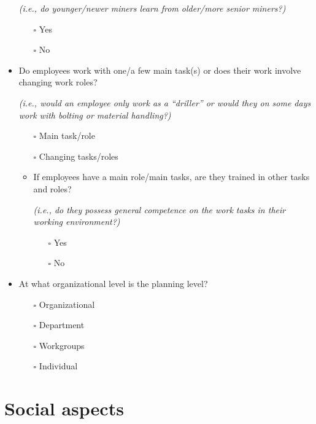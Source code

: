 \documentclass[
  12pt,
]{scrbook}
\providecommand{\tightlist}{%
  \setlength{\itemsep}{0pt}\setlength{\parskip}{0pt}}
\begin{document}
\begin{itemize}
  \emph{(i.e., do younger/newer miners learn from older/more senior miners?)}

  \begin{itemize}
  \tightlist
  \item[$\square$]
    Yes
  \item[$\square$]
    No
  \end{itemize}
\item
  Do employees work with one/a few main task(s) or does their work involve changing work
  roles?

  \emph{(i.e., would an employee only work as a ``driller'' or would they on some days work with bolting or material handling?)}

  \begin{itemize}
  \item[$\square$]
    Main task/role
  \item[$\square$]
    Changing tasks/roles
  \item
    If employees have a main role/main tasks, are they trained in other tasks and roles?

    \emph{(i.e., do they possess general competence on the work tasks in their working environment?)}

    \begin{itemize}
    \tightlist
    \item[$\square$]
      Yes
    \item[$\square$]
      No
    \end{itemize}
  \end{itemize}
\item
  At what organizational level is the planning level?

  \begin{itemize}
  \tightlist
  \item[$\square$]
    Organizational
  \item[$\square$]
    Department
  \item[$\square$]
    Workgroups
  \item[$\square$]
    Individual
  \end{itemize}
\end{itemize}

\hypertarget{social-aspects}{%
\section*{Social aspects}\label{social-aspects}}
\end{document}
